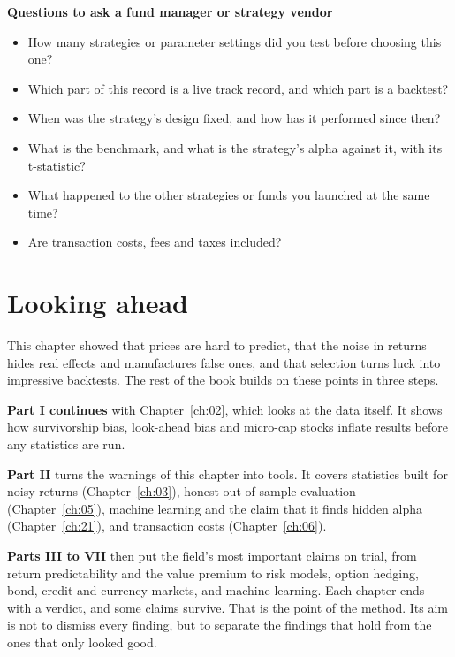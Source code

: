 \textbf{Questions to ask a fund manager or strategy vendor}

\begin{itemize}
  \item How many strategies or parameter settings did you test before choosing this one?
  \item Which part of this record is a live track record, and which part is a backtest?
  \item When was the strategy's design fixed, and how has it performed since then?
  \item What is the benchmark, and what is the strategy's alpha against it, with its t-statistic?
  \item What happened to the other strategies or funds you launched at the same time?
  \item Are transaction costs, fees and taxes included?
\end{itemize}

\section{Looking ahead}
\label{sec:01-ahead}

This chapter showed that prices are hard to predict, that the noise in returns hides real effects and manufactures false ones, and that selection turns luck into impressive backtests. The rest of the book builds on these points in three steps.

\textbf{Part I continues} with Chapter~\ref{ch:02}, which looks at the data itself. It shows how survivorship bias, look-ahead bias and micro-cap stocks inflate results before any statistics are run.

\textbf{Part II} turns the warnings of this chapter into tools. It covers statistics built for noisy returns (Chapter~\ref{ch:03}), honest out-of-sample evaluation (Chapter~\ref{ch:05}), machine learning and the claim that it finds hidden alpha (Chapter~\ref{ch:21}), and transaction costs (Chapter~\ref{ch:06}).

\textbf{Parts III to VII} then put the field's most important claims on trial, from return predictability and the value premium to risk models, option hedging, bond, credit and currency markets, and machine learning. Each chapter ends with a verdict, and some claims survive. That is the point of the method. Its aim is not to dismiss every finding, but to separate the findings that hold from the ones that only looked good.

